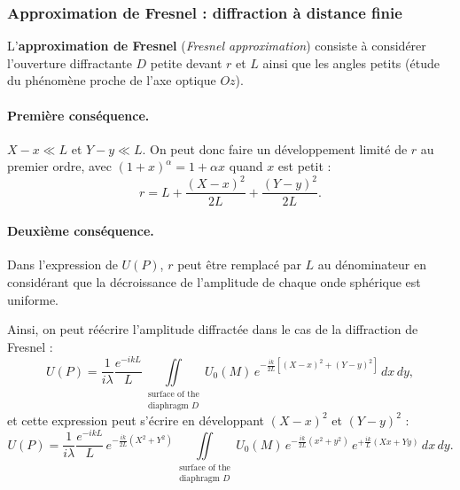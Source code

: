 \subsubsection{Approximation de Fresnel : diffraction à distance finie}
L'\textbf{approximation de Fresnel} (\textit{Fresnel approximation}) consiste à
considérer l'ouverture diffractante $D$ petite devant $r$ et $L$ ainsi que les
angles petits (étude du phénomène proche de l'axe optique $Oz$).

\paragraph{Première conséquence.} $X - x \ll L$ et $Y - y \ll L$. On peut donc
faire un développement limité de $r$ au premier ordre, avec
$(1+x)^{\alpha} = 1 + \alpha x$ quand $x$ est petit :
\begin{equation*}
  r = L + \frac{(X-x)^2}{2L} + \frac{(Y-y)^2}{2L}.
\end{equation*}

\paragraph{Deuxième conséquence.} Dans l'expression de $U(P)$, $r$ peut être
remplacé par $L$ au dénominateur en considérant que la décroissance de
l'amplitude de chaque onde sphérique est uniforme.

Ainsi, on peut réécrire l'amplitude diffractée dans le cas de la diffraction de
Fresnel :
\begin{equation*}
  U(P) = \frac{1}{i\lambda}\frac{e^{-ikL}}{L}
  \iint\limits_{\substack{\text{surface of the}\\ \text{diaphragm } D}}
  U_0(M)\, e^{-\frac{ik}{2L}\left[(X-x)^2 + (Y-y)^2\right]}\, dx\,dy ,
\end{equation*}
et cette expression peut s'écrire en développant $(X-x)^2$ et $(Y-y)^2$ :
\begin{equation*}
  U(P) = \frac{1}{i\lambda}\frac{e^{-ikL}}{L}\, e^{-\frac{ik}{2L}(X^2+Y^2)}
  \iint\limits_{\substack{\text{surface of the}\\ \text{diaphragm } D}}
  U_0(M)\, e^{-\frac{ik}{2L}(x^2+y^2)}\, e^{+\frac{ik}{L}(Xx+Yy)}\, dx\,dy .
\end{equation*}

